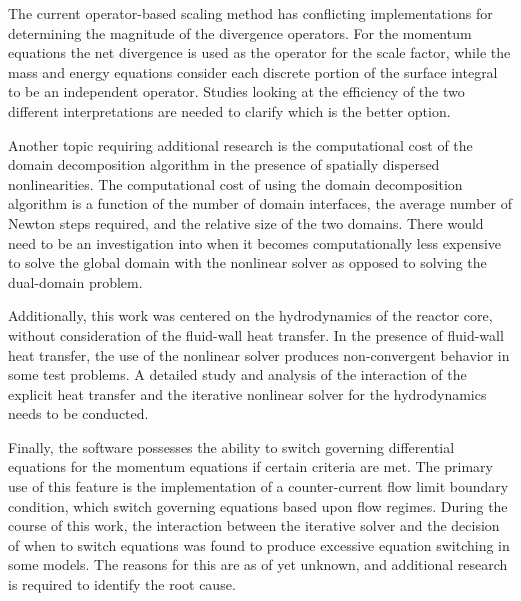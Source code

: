 The current operator-based scaling method has conflicting implementations for determining the magnitude of the divergence operators.
For the momentum equations the net divergence is used as the operator for the scale factor, while the mass and energy equations consider each discrete portion of the surface integral to be an independent operator.
Studies looking at the efficiency of the two different interpretations are needed to clarify which is the better option.

Another topic requiring additional research is the computational cost of the domain decomposition algorithm in the presence of spatially dispersed nonlinearities. 
The computational cost of using the domain decomposition algorithm is a function of the number of domain interfaces, the average number of Newton steps required, and the relative size of the two domains.
There would need to be an investigation into when it becomes computationally less expensive to solve the global domain with the nonlinear solver as opposed to solving the dual-domain problem.

Additionally, this work was centered on the hydrodynamics of the reactor core, without consideration of the fluid-wall heat transfer.
In the presence of fluid-wall heat transfer, the use of the nonlinear solver produces non-convergent behavior in some test problems.
A detailed study and analysis of the interaction of the explicit heat transfer and the iterative nonlinear solver for the hydrodynamics needs to be conducted.

Finally, the \cobra{} software possesses the ability to switch governing differential equations for the momentum equations if certain criteria are met.
The primary use of this feature is the implementation of a counter-current flow limit boundary condition, which switch governing equations based upon flow regimes.
During the course of this work, the interaction between the iterative solver and the decision of when to switch equations was found to produce excessive equation switching in some models.
The reasons for this are as of yet unknown, and additional research is required to identify the root cause.